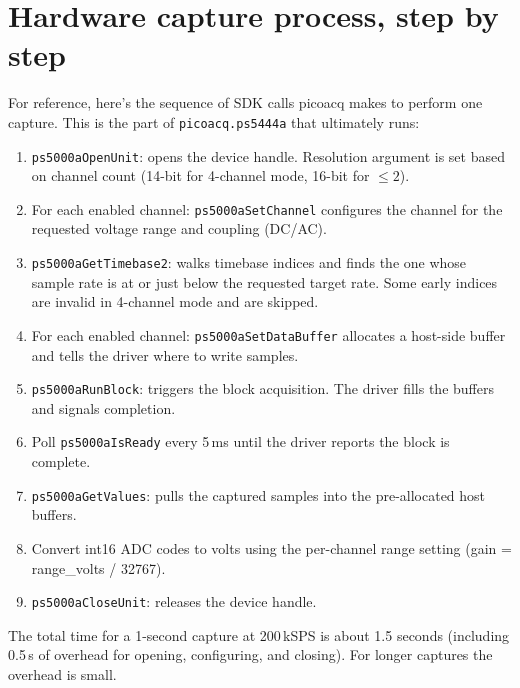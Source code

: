 \documentclass[11pt]{article}
\begin{document}
\section{Hardware capture process, step by step}

For reference, here's the sequence of SDK calls \textsf{picoacq}
makes to perform one capture.  This is the part of \texttt{picoacq.ps5444a}
that ultimately runs:

\begin{enumerate}\itemsep=2pt
\item \texttt{ps5000aOpenUnit}: opens the device handle.  Resolution
      argument is set based on channel count (14-bit for 4-channel
      mode, 16-bit for $\le 2$).
\item For each enabled channel: \texttt{ps5000aSetChannel} configures
      the channel for the requested voltage range and coupling
      (DC/AC).
\item \texttt{ps5000aGetTimebase2}: walks timebase indices and finds
      the one whose sample rate is at or just below the requested
      target rate.  Some early indices are invalid in 4-channel mode
      and are skipped.
\item For each enabled channel: \texttt{ps5000aSetDataBuffer} allocates
      a host-side buffer and tells the driver where to write samples.
\item \texttt{ps5000aRunBlock}: triggers the block acquisition.  The
      driver fills the buffers and signals completion.
\item Poll \texttt{ps5000aIsReady} every 5\,ms until the driver
      reports the block is complete.
\item \texttt{ps5000aGetValues}: pulls the captured samples into the
      pre-allocated host buffers.
\item Convert int16 ADC codes to volts using the per-channel range
      setting (gain = range\_volts / 32767).
\item \texttt{ps5000aCloseUnit}: releases the device handle.
\end{enumerate}

The total time for a 1-second capture at 200\,kSPS is about 1.5
seconds (including 0.5\,s of overhead for opening, configuring, and
closing).  For longer captures the overhead is small.

\end{document}

